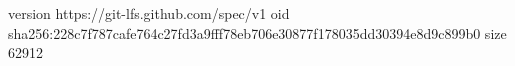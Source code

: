 version https://git-lfs.github.com/spec/v1
oid sha256:228c7f787cafe764c27fd3a9fff78eb706e30877f178035dd30394e8d9c899b0
size 62912
